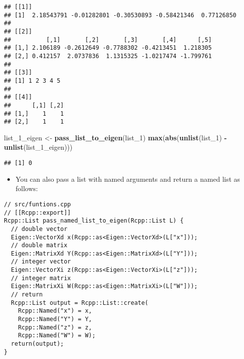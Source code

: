 \documentclass[
]{book}
\newenvironment{Shaded}{\begin{snugshade}}{\end{snugshade}}
\newcommand{\CommentTok}[1]{\textcolor[rgb]{0.56,0.35,0.01}{\textit{#1}}}
\newcommand{\FunctionTok}[1]{\textcolor[rgb]{0.13,0.29,0.53}{\textbf{#1}}}
\newcommand{\NormalTok}[1]{#1}
\newcommand{\OtherTok}[1]{\textcolor[rgb]{0.56,0.35,0.01}{#1}}
\newcommand{\SpecialCharTok}[1]{\textcolor[rgb]{0.81,0.36,0.00}{\textbf{#1}}}
\providecommand{\tightlist}{%
  \setlength{\itemsep}{0pt}\setlength{\parskip}{0pt}}
\begin{document}
\begin{verbatim}
## [[1]]
## [1]  2.18543791 -0.01282801 -0.30530893 -0.58421346  0.77126850
## 
## [[2]]
##          [,1]       [,2]       [,3]       [,4]      [,5]
## [1,] 2.106189 -0.2612649 -0.7788302 -0.4213451  1.218305
## [2,] 0.412157  2.0737836  1.1315325 -1.0217474 -1.799761
## 
## [[3]]
## [1] 1 2 3 4 5
## 
## [[4]]
##      [,1] [,2]
## [1,]    1    1
## [2,]    1    1
\end{verbatim}

\begin{Shaded}
\begin{Highlighting}[]
\NormalTok{list\_1\_eigen }\OtherTok{\textless{}{-}} \FunctionTok{pass\_list\_to\_eigen}\NormalTok{(list\_1)}
\FunctionTok{max}\NormalTok{(}\FunctionTok{abs}\NormalTok{(}\FunctionTok{unlist}\NormalTok{(list\_1) }\SpecialCharTok{{-}} \FunctionTok{unlist}\NormalTok{(list\_1\_eigen)))}
\end{Highlighting}
\end{Shaded}

\begin{verbatim}
## [1] 0
\end{verbatim}

\begin{itemize}
\tightlist
\item
  You can also pass a list with named arguments and return a named list as follows:
\end{itemize}

\begin{verbatim}
// src/funtions.cpp
// [[Rcpp::export]]
Rcpp::List pass_named_list_to_eigen(Rcpp::List L) {
  // double vector
  Eigen::VectorXd x(Rcpp::as<Eigen::VectorXd>(L["x"]));
  // double matrix
  Eigen::MatrixXd Y(Rcpp::as<Eigen::MatrixXd>(L["Y"]));
  // integer vector
  Eigen::VectorXi z(Rcpp::as<Eigen::VectorXi>(L["z"]));
  // integer matrix
  Eigen::MatrixXi W(Rcpp::as<Eigen::MatrixXi>(L["W"]));
  // return
  Rcpp::List output = Rcpp::List::create(
    Rcpp::Named("x") = x, 
    Rcpp::Named("Y") = Y, 
    Rcpp::Named("z") = z, 
    Rcpp::Named("W") = W);
  return(output);
}
\end{verbatim}

\begin{Shaded}
\end{Shaded}
\end{document}
